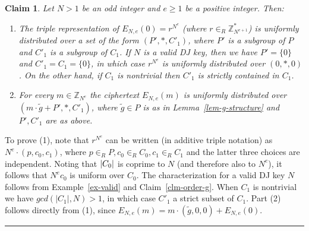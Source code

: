 \documentclass[11pt]{article}
\newtheorem{claim}[theorem]{Claim}
\newenvironment{proof}{\noindent {\bf Proof:} \hspace{.677em}}%
                     {\qed}
\newcommand{\qed}{\hspace*{\fill}\rule{0.6em}{0.6em}}
\newcommand{\encdj}{{E}_{N,e}}
\newcommand{\Z}{\mathbb{Z}}
\newcommand{\U}[1]{\mathbb{Z}_{#1}^*}
\newcommand{\mathify}[1]{\ifmmode{#1}\else\mbox{$#1$}\fi}
\newcommand{\size}[1]{\mathify{\left| #1 \right|}}
\begin{document}
\begin{claim}
\label{cl-djgeneral} Let $N>1$ be an odd integer and $e\ge 1$ be a
positive integer. Then:
\begin{enumerate}
  \item The triple representation of $\encdj(0)=r^{N^e}$ (where
  $r\in_R\U{N^{e+1}}$) is uniformly distributed over a
set of the form $(P',*,C'_1)$, where $P'$ is a subgroup of $P$ and
$C'_1$ is a subgroup of $C_1$. If $N$ is a valid DJ key, then we
have $P'=\{0\}$ and $C'_1=C_1=\{0\}$, in which case $r^{N^e}$ is
uniformly distributed over $(0,*,0)$. On the other hand, if $C_1$
is nontrivial then $C'_1$ is strictly contained in $C_1$.
 \item For every $m\in\Z_{N^e}$
the ciphertext $\encdj(m)$ is uniformly distributed over
$(m\cdot\tilde{g}+P',*,C'_1)$, where $\tilde{g}\in P$ is as in
Lemma~\ref{lem-g-structure} and $P',C'_1$ are as above.
\end{enumerate}
\end{claim}
\begin{proof}
To prove (1), note that $r^{N^e}$ can be written (in additive
triple notation) as $N^e\cdot (p,c_0,c_1)$, where $p\in_R P,
c_0\in_R C_0, c_1\in_R C_1$ and the latter three choices are
independent. Noting that $\size{C_0}$ is coprime to $N$ (and
therefore also to $N^e$), it follows that $N^ec_0$ is uniform over
$C_0$. The characterization for a valid DJ key $N$ follows from
Example~\ref{ex-valid} and Claim~\ref{clm-order-g}. When $C_1$ is
nontrivial we have $gcd(|C_1|,N)>1$, in which case $C'_1$ a strict
subset of $C_1$. Part (2) follows directly from (1), since
$\encdj(m)= m\cdot (\tilde{g},0,0)+\encdj(0)$.
\end{proof}

%
\end{document}
